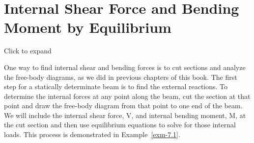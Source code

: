 \documentclass[
  letterpaper,
  DIV=11,
  numbers=noendperiod]{scrreprt}
\theoremstyle{definition}
\theoremstyle{remark}
\begin{document}
\section{Internal Shear Force and Bending Moment by
Equilibrium}\label{sec-7.1}

Click to expand

One way to find internal shear and bending forces is to cut sections and
analyze the free-body diagrams, as we did in previous chapters of this
book. The first step for a statically determinate beam is to find the
external reactions. To determine the internal forces at any point along
the beam, cut the section at that point and draw the free-body diagram
from that point to one end of the beam. We will include the internal
shear force, V, and internal bending moment, M, at the cut section and
then use equilibrium equations to solve for those internal loads. This
process is demonstrated in Example~\ref{exm-7.1}.
\end{document}
